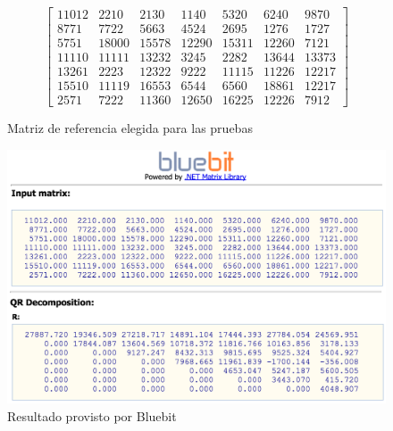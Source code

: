 \begin{figure}[h!]
\[
   \left[
      \begin{array}{ccccccc}
         11012 & 2210  & 2130  & 1140  & 5320  & 6240  & 9870  \\
         8771  & 7722  & 5663  & 4524  & 2695  & 1276  & 1727  \\
         5751  & 18000 & 15578 & 12290 & 15311 & 12260 & 7121  \\
         11110 & 11111 & 13232 & 3245  & 2282  & 13644 & 13373 \\
         13261 & 2223  & 12322 & 9222  & 11115 & 11226 & 12217 \\
         15510 & 11119 & 16553 & 6544  & 6560  & 18861 & 12217 \\
         2571  & 7222  & 11360 & 12650 & 16225 & 12226 & 7912
      \end{array}
   \right]
\]
\caption{Matriz de referencia elegida para las pruebas}
\end{figure}

\begin{figure}[h!]
  \begin{center}
    \includegraphics[width=15cm]{./figures/C05-sample_bluebit}
    \caption{Resultado provisto por Bluebit}
    \label{fig:testbench_vs_bluebit1}
  \end{center}
\end{figure}

\newpage

